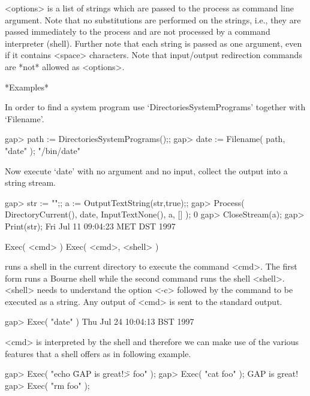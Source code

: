 <options> is a list of strings which are passed to the process as command
line argument.  Note that no substitutions are  performed on the strings,
i.e., they are passed immediately to the process and are not processed by
a command interpreter (shell).   Further note that  each string is passed
as one  argument,  even if it  contains  <space>  characters.  Note  that
input/output redirection commands are *not* allowed as <options>.

*Examples*

In   order to  find   a  system program  use  `DirectoriesSystemPrograms'
together with `Filename'.

\begintt
   gap> path := DirectoriesSystemPrograms();;
   gap> date := Filename( path, "date" );
   "/bin/date"
\endtt

Now execute `date' with no argument and no input, collect the output into
a string stream.

\begintt
    gap> str := "";; a := OutputTextString(str,true);;
    gap> Process( DirectoryCurrent(), date, InputTextNone(), a, [] );
    0
    gap> CloseStream(a);
    gap> Print(str);   
    Fri Jul 11 09:04:23 MET DST 1997
\endtt


\>Exec( <cmd> )
\>Exec( <cmd>, <shell> )

runs a shell in the current directory to execute  the command <cmd>.  The
first form runs a  Bourne shell while the  second command runs  the shell
<shell>.  <shell> needs  to understand the  option  <-c> followed by  the
command to be executed as a string.  Any  output of <cmd>  is sent to the
standard output.

\begintt
    gap> Exec( "date" )
    Thu Jul 24 10:04:13 BST 1997
\endtt

<cmd> is  interpreted by the shell  and therefore we  can make use of the
various features that a shell offers as in following example.

\beginexample
   gap> Exec( "echo \"GAP is great!\" > foo" );    
   gap> Exec( "cat foo" );
   GAP is great!
   gap> Exec( "rm foo" );
\endexample

